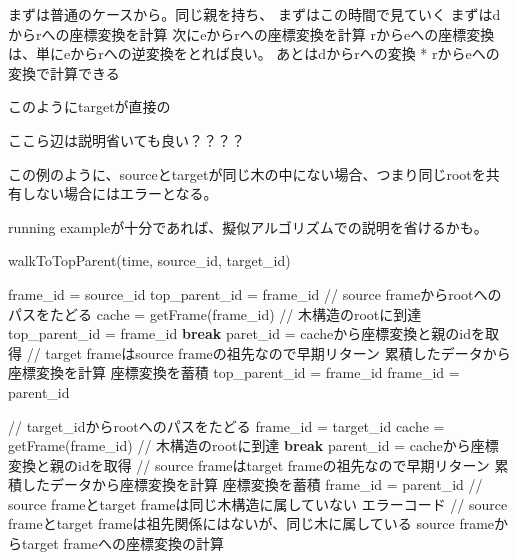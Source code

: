 \documentclass[a4paper]{jreport}	%
\begin{document}
まずは普通のケースから。同じ親を持ち、
%
まずはこの時間で見ていく
まずはdからrへの座標変換を計算
次にeからrへの座標変換を計算
rからeへの座標変換は、単にeからrへの逆変換をとれば良い。
あとはdからrへの変換 * rからeへの変換で計算できる


このようにtargetが直接の

ここら辺は説明省いても良い？？？？

この例のように、sourceとtargetが同じ木の中にない場合、つまり同じrootを共有しない場合にはエラーとなる。


running exampleが十分であれば、擬似アルゴリズムでの説明を省けるかも。

\begin{algorithm}[H]
	\caption{walkToTopParent(time, source\_id, target\_id)}
	\begin{algorithmic}
	\STATE frame\_id = source\_id
	\STATE top\_parent\_id = frame\_id
	\STATE // source frameからrootへのパスをたどる
	\STATE cache = getFrame(frame\_id)
	\STATE // 木構造のrootに到達
	\STATE top\_parent\_id = frame\_id
	\STATE \textbf{break}
	\ENDIF
	\STATE paret\_id = cacheから座標変換と親のidを取得
	\STATE // target frameはsource frameの祖先なので早期リターン
	\STATE 累積したデータから座標変換を計算
	\ENDIF
	\STATE 座標変換を蓄積
	\STATE top\_parent\_id = frame\_id
	\STATE frame\_id = parent\_id
	\ENDWHILE
	
	\STATE // target\_idからrootへのパスをたどる
	\STATE frame\_id = target\_id
	\STATE cache = getFrame(frame\_id)
	\STATE // 木構造のrootに到達
	\STATE \textbf{break}
	\ENDIF
	\STATE parent\_id = cacheから座標変換と親のidを取得
	\STATE // source frameはtarget frameの祖先なので早期リターン
	\STATE 累積したデータから座標変換を計算
	\ENDIF
	\STATE 座標変換を蓄積
	\STATE frame\_id = parent\_id
	\ENDWHILE
	\STATE // source frameとtarget frameは同じ木構造に属していない
	\RETURN エラーコード
	\ENDIF
	\STATE // source frameとtarget frameは祖先関係にはないが、同じ木に属している
	\STATE source frameからtarget frameへの座標変換の計算
	\end{algorithmic}
\end{algorithm}
\end{document}
